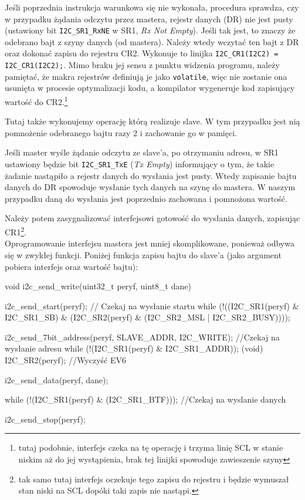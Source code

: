 \documentclass{pdfBooklets}
\begin{document}
Jeśli poprzednia instrukcja warunkowa się nie wykonała, procedura sprawdza, czy w przypadku żądania odczytu przez mastera, rejestr danych (DR) nie jest pusty (ustawiony bit \Verb$I2C_SR1_RxNE$
w SR1, \textit{Rx Not Empty}). Jeśli tak jest, to znaczy że odebrano bajt z szyny danych (od mastera). Należy wtedy wczytać ten bajt z DR oraz dokonać zapisu do rejestru
CR2. Wykonuje to linijka \Verb$I2C_CR1(I2C2) = I2C_CR1(I2C2);$. Mimo braku jej sensu z punktu widzenia programu, należy pamiętać, że makra rejestrów
definiują je jako \texttt{volatile}, więc nie zostanie ona usunięta w procesie optymalizacji kodu, a kompilator wygeneruje kod zapisujący wartość
do CR2.\footnote{tutaj podobnie, interfejs czeka na tę operację i trzyma linię SCL w stanie niskim aż do jej wystąpienia, brak tej linijki spowoduje
  zawieszenie szyny}

Tutaj także wykonujemy operację którą realizuje slave. W tym przypadku jest nią pomnożenie odebranego bajtu razy 2 i zachowanie go w pamięci.

Jeśli master wyśle żądanie odczytu ze slave'a, po otrzymaniu adresu, w SR1 ustawiony będzie bit \Verb$I2C_SR1_TxE$ (\textit{Tx Empty}) informujący
o tym, że takie żadanie nastąpiło a rejestr danych do wysłania jest pusty. Wtedy zapisanie bajtu danych do DR spowoduje wysłanie tych danych na szynę
do mastera. W naszym przypadku daną do wysłania jest poprzednio zachowana i pomnożona wartość.

Należy potem zasygnalizować interfejsowi gotowość do wysłania danych, zapisując CR1\footnote{tak samo tutaj interfejs oczekuje tego zapisu do rejestru i będzie wymuszał stan niski na SCL dopóki taki zapis nie nastąpi. }.\\

Oprogramowanie interfejsu mastera jest mniej skomplikowane, ponieważ odbywa się w zwykłej funkcji. Poniżej funkcja zapisu bajtu do slave'a (jako
argument pobiera interfejs oraz wartość bajtu):

\begin{CodeFrame*}[c]{}
void i2c_send_write(uint32_t peryf, uint8_t dane){
  i2c_send_start(peryf);
  // Czekaj na wysłanie startu
  while (!((I2C_SR1(peryf) & I2C_SR1_SB)
	   & (I2C_SR2(peryf) & (I2C_SR2_MSL | I2C_SR2_BUSY))));
  
  i2c_send_7bit_address(peryf, SLAVE_ADDR, I2C_WRITE);
  //Czekaj na wysłanie adresu
  while (!(I2C_SR1(peryf) & I2C_SR1_ADDR));
  (void) I2C_SR2(peryf); //Wyczyść EV6

  
  i2c_send_data(peryf, dane);

  while (!(I2C_SR1(peryf) & (I2C_SR1_BTF))); //Czekaj na wyslanie danych

  i2c_send_stop(peryf);
}
\end{CodeFrame*}
\end{document}
